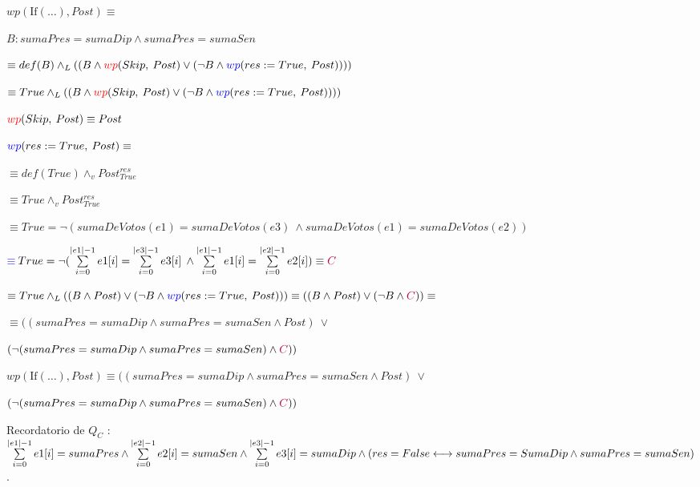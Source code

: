 \documentclass[10pt,a4paper]{article}
\begin{document}
\begin{enumerate}
\quad $wp(\text{If}(\dots), Post) \equiv$

\quad\quad $B : sumaPres = sumaDip \land sumaPres = sumaSen$

\quad\quad $\equiv def(B) \land_L ((B \land \textcolor{red}{wp}(Skip, \: Post) \lor (\neg B \land \textcolor{blue}{wp}(res := True , \: Post))))$

\quad\quad $\equiv True \land_L ((B \land \textcolor{red}{wp}(Skip, \: Post) \lor (\neg B \land \textcolor{blue}{wp}(res := True, \: Post))))$

\quad\quad\quad $\textcolor{red}{wp}(Skip, \: Post) \equiv Post$

\quad\quad\quad $\textcolor{blue}{wp}(res := True, \: Post) \equiv$

\quad\quad\quad\quad $\equiv def(True) \land_v Post^{res}_{True}$

\quad\quad\quad\quad $\equiv True \land_v Post^{res}_{True}$

\quad\quad\quad\quad $\equiv True = \neg{(sumaDeVotos(e1) = sumaDeVotos(e3) \: \land sumaDeVotos(e1) = sumaDeVotos(e2))}$

\quad\quad\quad\quad $\textcolor{blue}{\equiv} \: True = \neg(\sum\limits_{i=0}^{|e1| - 1} e1[i] = \sum\limits_{i=0}^{|e3| - 1} e3[i] \: \land
 \sum\limits_{i=0}^{|e1| - 1} e1[i] = \sum\limits_{i=0}^{|e2| - 1} e2[i]) \equiv \textcolor{purple}{C}$ 

\quad\quad $\equiv True \land_L ((B \land Post) \lor (\neg B \land \textcolor{blue}{wp}(res := True, \: Post))) \equiv 
((B \land Post) \lor (\neg{B} \land \textcolor{purple}{C})) \equiv$

\quad\quad $\equiv ((sumaPres = sumaDip \land sumaPres = sumaSen \land Post) \: \lor$ 

\quad\quad\quad $(\neg{(sumaPres = sumaDip \land sumaPres = sumaSen) \land \textcolor{purple}{C}}))$

\vspace{1mm} 

\quad $ wp(\text{If}(\dots), Post) \equiv ((sumaPres = sumaDip \land sumaPres = sumaSen \land Post) \: \lor$ 

\quad\quad $(\neg{(sumaPres = sumaDip \land sumaPres = sumaSen) \land \textcolor{purple}{C}}))$

\vspace{3mm} 

Recordatorio de $Q_C$ : $\sum\limits_{i=0}^{|e1| - 1} e1[i] = sumaPres \land \sum\limits_{i=0}^{|e2| - 1} e2[i] = sumaSen \land \sum\limits_{i=0}^{|e3| - 1} e3[i] = sumaDip \land \\ 
 (res = False \longleftrightarrow sumaPres = SumaDip \land sumaPres = sumaSen)$.


\end{enumerate}
\end{document}
